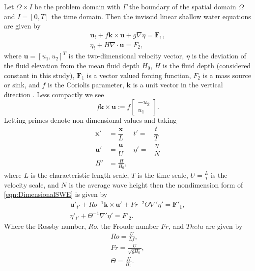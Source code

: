 Let $\Omega \times I$ be the problem domain with $\Gamma$ the boundary of the
spatial domain $\Omega$ and $I = [0, T]$ the time domain.  Then the inviscid
linear shallow water equations are given by
\begin{equation}
  \begin{split}
    \mathbf{u}_t + f\mathbf{k} \times \mathbf{u} + g \nabla \eta = \mathbf{F}_1, \\
    \eta_t + H \nabla\cdot \mathbf{u} = F_2,
  \end{split}
  \label{eqn:DimensionalSWE}
\end{equation}
where $\mathbf{u}=[u_1,u_2]^T$ is the two-dimensional velocity vector, $\eta$ is the
deviation of the fluid elevation from the mean fluid depth $H_0$, $H$ is the
fluid depth (considered constant in this study), $\mathbf{F}_1$ is a vector valued
forcing function, $F_2$ is a mass source or sink, and $f$ is the Coriolis
parameter, $\mathbf{k}$ is a unit vector in the vertical direction
\cite{Hanert2004, LeBlond1981, Le-Roux1998}.  Less compactly we see
\begin{equation}
  f\mathbf{k} \times \mathbf{u} := f\begin{bmatrix}
    -u_2 \\
    u_1
  \end{bmatrix}.
  \label{eqn:Coriolis}
\end{equation}
Letting primes denote non-dimensional values and taking
\begin{align*}
    \mathbf{x}' &= \dfrac{\mathbf{x}}{L} &t' =& \dfrac{t}{T} \\[1em]
    \mathbf{u}' &= \dfrac{\mathbf{u}}{U} &\eta' =& \dfrac{\eta}{N} \\[1em]
    H' &= \frac{H}{H_0},
\end{align*}
where $L$ is the characteristic length scale, $T$ is the time scale,
$U=\frac{L}{T}$ is the velocity scale, and $N$ is the average wave height then
the nondimension form of \eqref{eqn:DimensionalSWE} is given by
\begin{equation}
  \begin{split}
    \mathbf{u}'_{t'} + Ro^{-1} \mathbf{k}\times\mathbf{u}' 
        + Fr^{-2} \Theta \nabla' \eta' = \mathbf{F}'_1, \\
      \eta'_{t'} + \Theta^{-1} \nabla' \eta' = F'_2.
  \end{split}
  \label{eqn:NondimensionalSWE}
\end{equation}
Where the Rossby number, $Ro$, the Froude number $Fr$, and $Theta$ are given by
\begin{align}
  Ro = \frac{U}{Lf}, \label{eqn:Rossby} \\
  Fr = \frac{U}{\sqrt{gH_0}}, \label{eqn:Froude} \\
  \Theta = \frac{N}{H_0}. \label{eqn:Theta}
\end{align}

